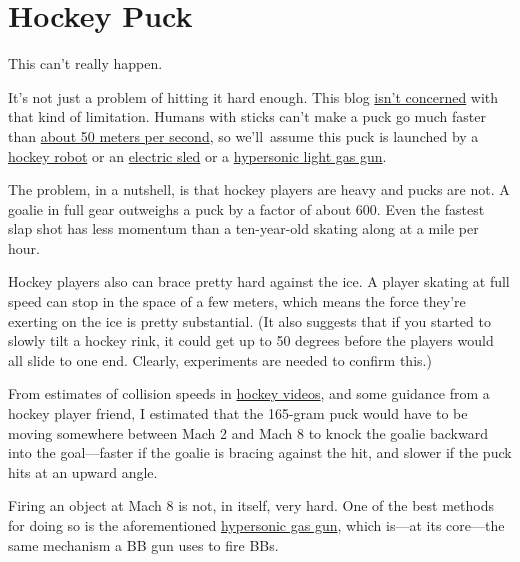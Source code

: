 {
\chapter{Hockey Puck}
}

\hfill{}

{This can’t really happen.}

{It’s not just a problem of hitting it hard enough. This blog \href{http://what-if.xkcd.com/1/}{isn’t concerned} with that kind of limitation. Humans with sticks can’t make a puck go much faster than \href{http://sports.yahoo.com/blogs/nhl-puck-daddy/khl-alexander-ryazantsev-sets-world-record-hardest-shot-174131642.html}{about 50 meters per second}, so we’ll assume this puck is launched by a \href{http://hockeyrobotics.com/}{hockey robot} or an \href{http://www.psfc.mit.edu/\~radovinsky/papers/32.pdf}{electric sled} or a \href{http://www.nasa.gov/centers/wstf/laboratories/hypervelocity/gasguns.html} {hypersonic light gas gun}.}

{The problem, in a nutshell, is that hockey players are heavy and pucks are not. A goalie in full gear outweighs a puck by a factor of about 600. Even the fastest slap shot has less momentum than a ten-year-old skating along at a mile per hour.}

{Hockey players also can brace pretty hard against the ice. A player skating at full speed can stop in the space of a few meters, which means the force they’re exerting on the ice is pretty substantial. (It also suggests that if you started to slowly tilt a hockey rink, it could get up to 50 degrees before the players would all slide to one end. Clearly, experiments are needed to confirm this.)}

{From estimates of collision speeds in \href{http://www.youtube.com/watch?v=fWj6--Cf9QA}{hockey videos}, and some guidance from a hockey player friend, I estimated that the 165-gram puck would have to be moving somewhere between Mach 2 and Mach 8 to knock the goalie backward into the goal—faster if the goalie is bracing against the hit, and slower if the puck hits at an upward angle.}

{Firing an object at Mach 8 is not, in itself, very hard. One of the best methods for doing so is the aforementioned \href{http://www.nasa.gov/centers/wstf/laboratories/hypervelocity/gasguns.html}{hypersonic gas gun}, which is—at its core—the same mechanism a BB gun uses to fire BBs.}

